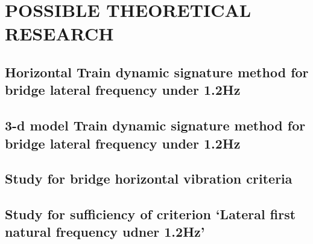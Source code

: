 
\chapter{POSSIBLE THEORETICAL RESEARCH}

\section{Horizontal Train dynamic signature method for bridge lateral frequency under 1.2Hz}
\section{3-d model Train dynamic signature method for bridge lateral frequency under 1.2Hz}
\section{Study for bridge horizontal vibration criteria}
\section{Study for sufficiency of criterion `Lateral first natural frequency udner 1.2Hz'}
